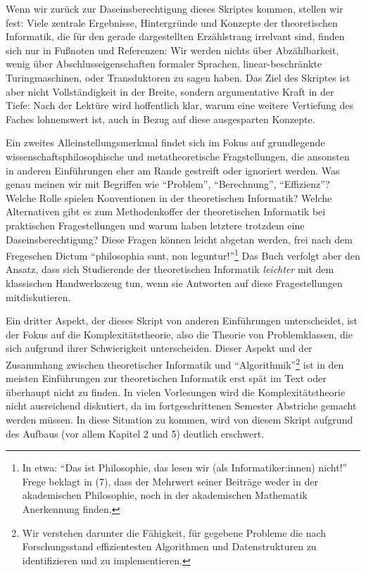Wenn wir zurück zur Daseinsberechtigung dieses Skriptes kommen,
stellen wir fest:
Viele zentrale Ergebnisse, Hintergründe und Konzepte
der theoretischen Informatik,
die für den gerade dargestellten Erzählstrang irrelvant sind,
finden sich nur in Fußnoten und Referenzen:
Wir werden nichts über Abzählbarkeit,
wenig über Abschlusseigenschaften formaler Sprachen,
linear-beschränkte Turingmaschinen,
oder Transduktoren zu sagen haben.
Das Ziel des Skriptes ist aber nicht Vollständigkeit in der Breite,
sondern argumentative Kraft in der Tiefe:
Nach der Lektüre wird hoffentlich klar,
warum eine weitere Vertiefung des Faches lohnenswert ist,
auch in Bezug auf diese ausgesparten Konzepte.

Ein zweites Alleinstellungsmerkmal findet sich im Fokus auf grundlegende
wissenschaftsphilosophische und metatheoretische Fragstellungen,
die ansonsten in anderen Einführungen eher am Rande gestreift
oder ignoriert werden.
Was genau meinen wir mit Begriffen wie ``Problem'', ``Berechnung'', ``Effizienz''?
Welche Rolle spielen Konventionen in der theoretischen Informatik?
Welche Alternativen gibt es zum Methodenkoffer der theoretischen Informatik
bei praktischen Fragestellungen
und warum haben letztere trotzdem eine Daseinsberechtigung?
Diese Fragen können leicht abgetan werden, frei nach dem Fregeschen Dictum
``philosophia sunt, non leguntur!''\footnote{
    In etwa: ``Das ist Philosophie,
    das lesen wir (als Informatiker:innen) nicht!''
    Frege beklagt in \cite{frege_grundgesetze} (7),
    dass der Mehrwert seiner Beiträge weder in der akademischen Philosophie,
    noch in der akademischen Mathematik Anerkennung finden.
}
Das Buch verfolgt aber den Ansatz,
dass sich Studierende der theoretischen Informatik
\emph {leichter} mit dem klassischen Handwerkszeug tun,
wenn sie Antworten auf diese Fragestellungen mitdiskutieren.

Ein dritter Aspekt, der dieses Skript von anderen Einführungen unterscheidet,
ist der Fokus auf die Komplexitätstheorie,
also die Theorie von Problemklassen,
die sich aufgrund ihrer Schwierigkeit unterscheiden.
Dieser Aspekt und der Zusammhang zwischen theoretischer Informatik und ``Algorithmik''\footnote{
    Wir verstehen darunter die Fähigkeit,
    für gegebene Probleme die nach Forschungsstand
    effizientesten Algorithmen und Datenstrukturen zu identifizieren
    und zu implementieren.}
ist in den meisten Einführungen zur theoretischen Informatik
erst spät im Text oder überhaupt nicht zu finden.
In vielen Vorlesungen wird die Komplexitätstheorie nicht ausreichend diskutiert,
da im fortgeschrittenen Semester Abstriche gemacht werden müssen.
In diese Situation zu kommen, wird von diesem Skript aufgrund des Aufbaus
(vor allem Kapitel 2 und 5) deutlich erschwert.

